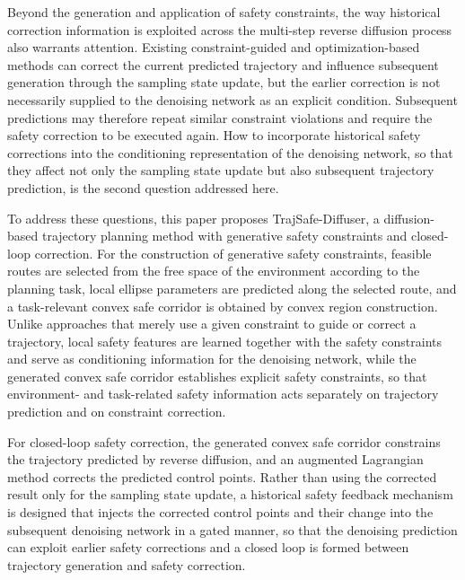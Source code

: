 \documentclass[journal]{IEEEtran}
\begin{document}
Beyond the generation and application of safety constraints, the way
historical correction information is exploited across the multi-step reverse
diffusion process also warrants attention. Existing constraint-guided and
optimization-based methods can correct the current predicted trajectory and
influence subsequent generation through the sampling state update, but the
earlier correction is not necessarily supplied to the denoising network as an
explicit condition. Subsequent predictions may therefore repeat similar
constraint violations and require the safety correction to be executed again.
How to incorporate historical safety corrections into the conditioning
representation of the denoising network, so that they affect not only the
sampling state update but also subsequent trajectory prediction, is the second
question addressed here.

To address these questions, this paper proposes TrajSafe-Diffuser, a
diffusion-based trajectory planning method with generative safety constraints
and closed-loop correction. For the construction of generative safety
constraints, feasible routes are selected from the free space of the
environment according to the planning task, local ellipse parameters are
predicted along the selected route, and a task-relevant convex safe corridor is
obtained by convex region construction. Unlike approaches that merely use a
given constraint to guide or correct a trajectory, local safety features are
learned together with the safety constraints and serve as conditioning
information for the denoising network, while the generated convex safe corridor
establishes explicit safety constraints, so that environment- and task-related
safety information acts separately on trajectory prediction and on constraint
correction.

For closed-loop safety correction, the generated convex safe corridor
constrains the trajectory predicted by reverse diffusion, and an augmented
Lagrangian method corrects the predicted control points. Rather than using the
corrected result only for the sampling state update, a historical safety
feedback mechanism is designed that injects the corrected control points and
their change into the subsequent denoising network in a gated manner, so that
the denoising prediction can exploit earlier safety corrections and a closed
loop is formed between trajectory generation and safety correction.
\end{document}
